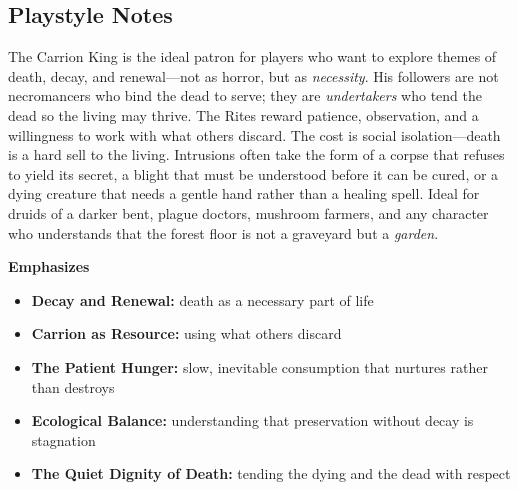 \subsection*{Playstyle Notes}

The Carrion King is the ideal patron for players who want to explore themes of death, decay, and renewal---not as horror, but as \textit{necessity}. His followers are not necromancers who bind the dead to serve; they are \textit{undertakers} who tend the dead so the living may thrive. The Rites reward patience, observation, and a willingness to work with what others discard. The cost is social isolation---death is a hard sell to the living. Intrusions often take the form of a corpse that refuses to yield its secret, a blight that must be understood before it can be cured, or a dying creature that needs a gentle hand rather than a healing spell. Ideal for druids of a darker bent, plague doctors, mushroom farmers, and any character who understands that the forest floor is not a graveyard but a \textit{garden}.

\noindent\textbf{Emphasizes}
\begin{itemize}
  \item \textbf{Decay and Renewal:} death as a necessary part of life
  \item \textbf{Carrion as Resource:} using what others discard
  \item \textbf{The Patient Hunger:} slow, inevitable consumption that nurtures rather than destroys
  \item \textbf{Ecological Balance:} understanding that preservation without decay is stagnation
  \item \textbf{The Quiet Dignity of Death:} tending the dying and the dead with respect
\end{itemize}

